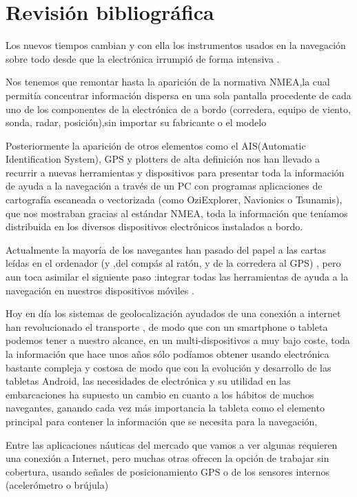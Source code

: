 \chapter{Revisión bibliográfica}
\label{revision}


Los nuevos tiempos cambian  y con ella  los instrumentos usados en la navegación sobre todo desde que la electrónica  irrumpió de forma intensiva .

Nos tenemos que remontar  hasta la  aparición de la normativa NMEA,la cual permitía concentrar  información dispersa  en una sola pantalla procedente de cada uno de los componentes de la electrónica de a bordo (corredera, equipo de viento, sonda, radar, posición),sin importar su fabricante o el modelo

Posteriormente la aparición de otros elementos como el AIS(Automatic Identification System),  GPS y plotters de alta definición nos han llevado a recurrir a nuevas herramientas y dispositivos para presentar toda la información de ayuda a la navegación a través de un PC   con programas aplicaciones de cartografía escaneada o vectorizada (como OziExplorer, Navionics o Tsunamis),  que nos mostraban gracias al estándar NMEA, toda la información que teníamos distribuida en los diversos dispositivos electrónicos instalados a bordo.

Actualmente la mayoría de los navegantes han pasado del papel a las cartas leídas en el ordenador (y ,del compás al ratón, y de la corredera al GPS) , pero aun  toca  asimilar el siguiente paso :integrar todas las herramientas de ayuda a la navegación en nuestros dispositivos móviles .

 Hoy en día los sistemas de geolocalización  ayudados de una conexión a  internet han revolucionado el transporte , de modo que  con un smartphone o  tableta podemos tener a nuestro alcance, en un multi-dispositivos  a muy bajo coste, toda la información que hace unos años sólo podíamos obtener usando electrónica bastante  compleja  y costosa de modo  que con la evolución y desarrollo de las tabletas Android, las necesidades de electrónica y su utilidad en las embarcaciones ha supuesto un cambio en cuanto a los hábitos de muchos navegantes, ganando cada vez más importancia la tableta como el elemento principal para contener la información que se necesita para la navegación,

Entre las aplicaciones náuticas del mercado que vamos a ver  algunas requieren una conexión a Internet, pero muchas otras ofrecen la opción de trabajar sin cobertura, usando  señales de posicionamiento GPS o de los sensores internos (acelerómetro o brújula)

